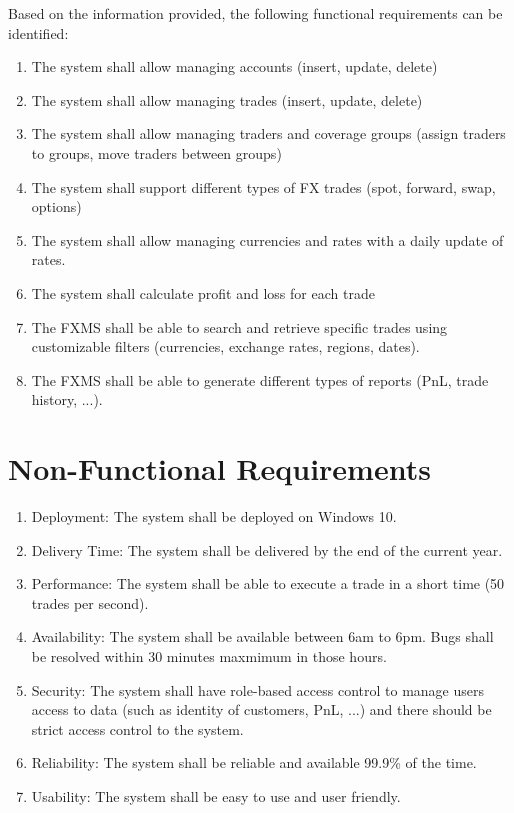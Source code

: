 \documentclass[a4paper]{report}
\begin{document}
Based on the information provided, the following functional requirements can be identified:
\begin{enumerate}
    \item The system shall allow managing accounts (insert, update, delete)
    \item The system shall allow managing trades (insert, update, delete)
    \item The system shall allow managing traders and coverage groups (assign traders to groups, move traders between groups)
    \item The system shall support different types of FX trades (spot, forward, swap, options)
    \item The system shall allow managing currencies and rates with a daily update of rates.
    \item The system shall calculate profit and loss for each trade
    \item The FXMS shall be able to search and retrieve specific trades using customizable filters (currencies, exchange rates, regions, dates).
    \item The FXMS shall be able to generate different types of reports (PnL, trade history, ...).
\end{enumerate}

\chapter{Non-Functional Requirements}

\begin{enumerate}
    \item Deployment: The system shall be deployed on Windows 10.
    \item Delivery Time: The system shall be delivered by the end of the current year.
    \item Performance: The system shall be able to execute a trade in a short time (50 trades per second).
    \item Availability: The system shall be available between 6am to 6pm. Bugs shall be resolved within 30 minutes maxmimum in those hours.
    \item Security: The system shall have role-based access control to manage users access to data (such as identity of customers, PnL, ...) and there should be strict access control to the system.
    \item Reliability: The system shall be reliable and available 99.9\% of the time.
    \item Usability: The system shall be easy to use and user friendly.
\end{enumerate}
\end{document}
